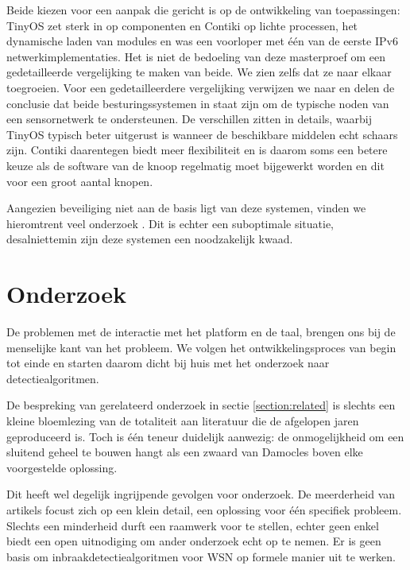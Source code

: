 Beide kiezen voor een aanpak die gericht is op de ontwikkeling van
toepassingen: TinyOS zet sterk in op componenten en Contiki op lichte
processen, het dynamische laden van modules en was een voorloper met \'e\'en
van de eerste IPv6 netwerkimplementaties. Het is niet de bedoeling van deze
masterproef om een gedetailleerde vergelijking te maken van beide. We zien
zelfs dat ze naar elkaar toegroeien. Voor een gedetailleerdere vergelijking
verwijzen we naar \citep{reusing2012comparison} en delen de conclusie dat beide
besturingssystemen in staat zijn om de typische noden van een sensornetwerk te
ondersteunen. De verschillen zitten in details, waarbij TinyOS typisch beter
uitgerust is wanneer de beschikbare middelen echt schaars zijn. Contiki
daarentegen biedt meer flexibiliteit en is daarom soms een betere keuze als de
software van de knoop regelmatig moet bijgewerkt worden en dit voor een groot
aantal knopen.

Aangezien beveiliging niet aan de basis ligt van deze systemen, vinden we
hieromtrent veel onderzoek \citep{paul2009safe, casado2009contikisec,
karlof2004tinysec}. Dit is echter een suboptimale situatie, desalniettemin zijn
deze systemen een noodzakelijk kwaad.

\section{Onderzoek}
\label{section:problem-research}

De problemen met de interactie met het platform en de taal, brengen ons bij de
menselijke kant van het probleem. We volgen het ontwikkelingsproces van begin
tot einde en starten daarom dicht bij huis met het onderzoek naar
detectiealgoritmen.

De bespreking van gerelateerd onderzoek in sectie \ref{section:related} is
slechts een kleine bloemlezing van de totaliteit aan literatuur die de
afgelopen jaren geproduceerd is. Toch is \'e\'en teneur duidelijk aanwezig: de
onmogelijkheid om een sluitend geheel te bouwen hangt als een zwaard van
Damocles boven elke voorgestelde oplossing.

Dit heeft wel degelijk ingrijpende gevolgen voor onderzoek. De meerderheid van
artikels focust zich op een klein detail, een oplossing voor \'e\'en specifiek
probleem. Slechts een minderheid durft een raamwerk voor te stellen, echter
geen enkel biedt een open uitnodiging om ander onderzoek echt op te nemen. Er
is geen basis om inbraakdetectiealgoritmen voor WSN op formele manier uit te
werken.

